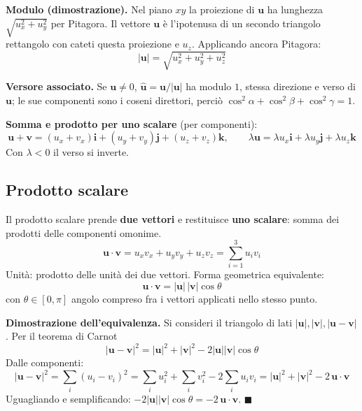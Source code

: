\documentclass[11pt,a4paper]{article}
\newcommand{\vv}[1]{\mathbf{#1}}
\newcommand{\mo}[1]{\left|#1\right|}
\begin{document}
\textbf{Modulo (dimostrazione).} Nel piano $xy$ la proiezione di $\vv u$ ha lunghezza $\sqrt{u_x^2+u_y^2}$ per Pitagora. Il vettore $\vv u$ è l'ipotenusa di un secondo triangolo rettangolo con cateti questa proiezione e $u_z$. Applicando ancora Pitagora:
\begin{equation}
\mo{\vv u}=\sqrt{u_x^2+u_y^2+u_z^2}
\end{equation}

\textbf{Versore associato.} Se $\vv u\neq0$, $\hat{\vv u}=\vv u/\mo{\vv u}$ ha modulo $1$, stessa direzione e verso di $\vv u$; le sue componenti sono i coseni direttori, perciò $\cos^2\alpha+\cos^2\beta+\cos^2\gamma=1$.

\textbf{Somma e prodotto per uno scalare} (per componenti):
\begin{equation}
\vv u+\vv v=(u_x+v_x)\vv i+(u_y+v_y)\vv j+(u_z+v_z)\vv k,\qquad \lambda\vv u=\lambda u_x\vv i+\lambda u_y\vv j+\lambda u_z\vv k
\end{equation}
Con $\lambda<0$ il verso si inverte.

\subsection{Prodotto scalare}
Il prodotto scalare prende \textbf{due vettori} e restituisce \textbf{uno scalare}: somma dei prodotti delle componenti omonime.
\begin{equation}
\vv u\cdot\vv v=u_xv_x+u_yv_y+u_zv_z=\sum_{i=1}^{3}u_iv_i
\end{equation}
Unità: prodotto delle unità dei due vettori. Forma geometrica equivalente:
\begin{equation}
\vv u\cdot\vv v=\mo{\vv u}\,\mo{\vv v}\cos\theta
\end{equation}
con $\theta\in[0,\pi]$ angolo compreso fra i vettori applicati nello stesso punto.

\textbf{Dimostrazione dell'equivalenza.} Si consideri il triangolo di lati $\mo{\vv u},\mo{\vv v},\mo{\vv u-\vv v}$. Per il teorema di Carnot
\begin{equation}
\mo{\vv u-\vv v}^2=\mo{\vv u}^2+\mo{\vv v}^2-2\mo{\vv u}\mo{\vv v}\cos\theta
\end{equation}
Dalle componenti:
\begin{equation}
\mo{\vv u-\vv v}^2=\sum_i(u_i-v_i)^2=\sum_iu_i^2+\sum_iv_i^2-2\sum_iu_iv_i=\mo{\vv u}^2+\mo{\vv v}^2-2\,\vv u\cdot\vv v
\end{equation}
Uguagliando e semplificando: $-2\mo{\vv u}\mo{\vv v}\cos\theta=-2\,\vv u\cdot\vv v$. \hfill$\blacksquare$
\end{document}
